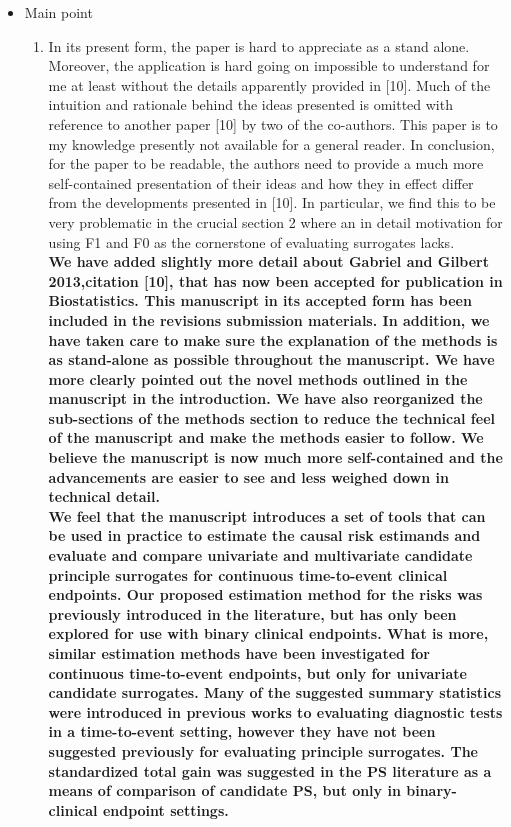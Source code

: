 \documentclass[11pt]{article} %
\begin{document}
\begin{itemize}
\item Main point
\begin{enumerate}
 \item In its present form, the paper is hard to appreciate as a stand alone. Moreover, the application is hard going on impossible to understand for me at least without the details apparently provided in [10]. Much of the intuition and rationale behind the ideas presented is omitted with reference to another paper [10] by two of the co-authors. This paper is to my knowledge presently not available for a general reader. In conclusion, for the paper to be readable, the authors need to provide a much more self-contained presentation of their ideas and how they in effect differ from the developments presented in [10]. In particular, we find this to be very problematic in the crucial section 2 where an in detail motivation for using F1 and F0 as the cornerstone of evaluating surrogates lacks.\\
 \textbf{We have added slightly more detail about Gabriel and Gilbert 2013,citation [10], that has now been accepted for publication in Biostatistics. This manuscript in its accepted form has been included in the revisions submission materials. In addition, we have taken care to make sure the explanation of the methods is as stand-alone as possible throughout the manuscript. We have more clearly pointed out the novel methods outlined in the manuscript in the introduction. We have also reorganized the sub-sections of the methods section to reduce the technical feel of the manuscript and make the methods easier to follow. We believe the manuscript is now much more self-contained and the advancements are easier to see and less weighed down in technical detail.\\
 We feel that the manuscript introduces a set of tools that can be used in practice to estimate the causal risk estimands and evaluate and compare univariate and multivariate candidate principle surrogates for continuous time-to-event clinical endpoints. Our proposed estimation method for the risks was previously introduced in the literature, but has only been explored for use with binary clinical endpoints. What is more, similar estimation methods have been investigated for continuous time-to-event endpoints, but only for univariate candidate surrogates. Many of the suggested summary statistics were introduced in previous works to evaluating diagnostic tests in a time-to-event setting, however they have not been suggested previously for evaluating principle surrogates. The standardized total gain was suggested in the PS literature as a means of comparison of candidate PS, but only in binary-clinical endpoint settings.}

\end{enumerate}
\end{itemize}
\end{document}
